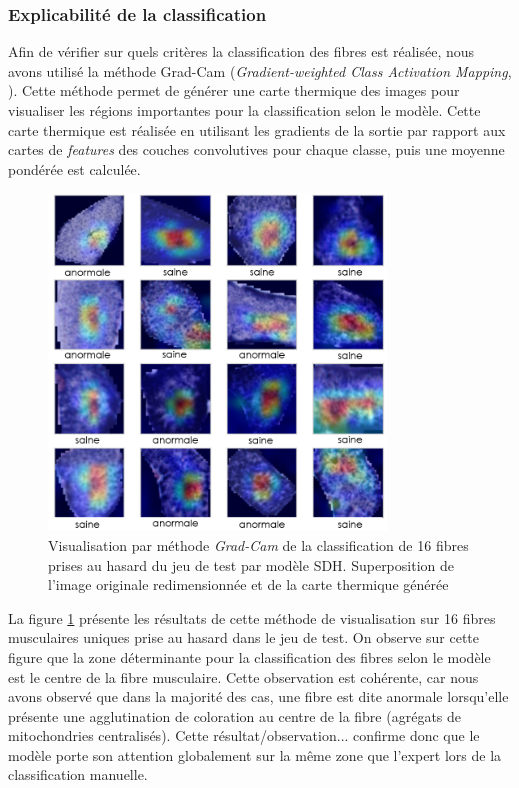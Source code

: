 \subsubsection{Explicabilité de la classification}
Afin de vérifier sur quels critères la classification des fibres est réalisée, nous avons utilisé la méthode Grad-Cam (\textit{Gradient-weighted Class Activation Mapping}, \cite{selvaraju_grad-cam_2020}). Cette méthode permet de générer une carte thermique des images pour visualiser les régions importantes pour la classification selon le modèle. Cette carte thermique est réalisée en utilisant les gradients de la sortie par rapport aux cartes de \textit{features} des couches convolutives pour chaque classe, puis une moyenne pondérée est calculée.

\begin{figure}[!ht]
 \centering
 \includegraphics[width=0.8\textwidth]{figures/sdh_gradcam.png}
 \caption[Visualisation par méthode \textit{Grad-Cam} du modèle SDH]{Visualisation par méthode  \textit{Grad-Cam} de la classification de 16 fibres prises au hasard du jeu de test par modèle SDH. Superposition de l'image originale redimensionnée et de la carte thermique générée}
 \label{fig:gradcam_sdh}
\end{figure}
La figure \ref{fig:gradcam_sdh} présente les résultats de cette méthode de visualisation sur 16 fibres musculaires uniques prise au hasard dans le jeu de test. On observe sur cette figure que la zone déterminante pour la classification des fibres selon le modèle est le centre de la fibre musculaire. Cette observation est cohérente, car nous avons observé que dans la majorité des cas, une fibre est dite anormale lorsqu'elle présente une agglutination de coloration au centre de la fibre (agrégats de mitochondries centralisés). Cette résultat/observation... confirme donc que le modèle porte son attention globalement sur la même zone que l'expert lors de la classification manuelle. 

